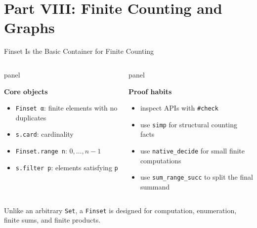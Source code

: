 \documentclass[aspectratio=169,10pt]{beamer}
\newcommand{\term}[1]{\textcolor{DOneBlue}{\textbf{#1}}}
\newenvironment{dpanel}{%
  \begin{beamercolorbox}[wd=\dimexpr\linewidth-9pt\relax,leftskip=0.15cm,rightskip=0.15cm plus1fil,rounded=true]{panel}%
  \setlength{\linewidth}{\hsize}%
  \vspace{0.10cm}%
}{\vspace{0.10cm}\end{beamercolorbox}}
\begin{document}
\section{Part VIII: Finite Counting and Graphs}

\begin{frame}{Finset Is the Basic Container for Finite Counting}
\begin{columns}[T,onlytextwidth]
\begin{dpanel}
\term{Core objects}
\begin{itemize}
  \item \texttt{Finset α}: finite elements with no duplicates
  \item \texttt{s.card}: cardinality
  \item \texttt{Finset.range n}: \(0,\ldots,n-1\)
  \item \texttt{s.filter p}: elements satisfying \texttt{p}
\end{itemize}
\end{dpanel}
\begin{dpanel}
\term{Proof habits}
\begin{itemize}
  \item inspect APIs with \texttt{\#check}
  \item use \texttt{simp} for structural counting facts
  \item use \texttt{native\_decide} for small finite computations
  \item use \texttt{sum\_range\_succ} to split the final summand
\end{itemize}
\end{dpanel}
\end{columns}
\vspace{0.38cm}
Unlike an arbitrary \texttt{Set}, a \texttt{Finset} is designed for computation, enumeration, finite sums, and finite products.
\end{frame}
\end{document}
